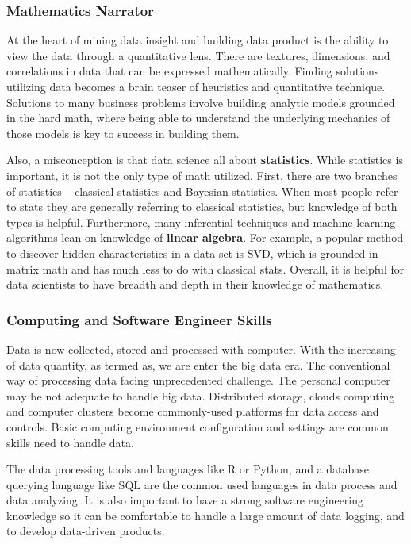 \documentclass[
]{book}
\begin{document}
\hypertarget{mathematics-narrator}{%
\subsubsection{Mathematics Narrator}\label{mathematics-narrator}}

At the heart of mining data insight and building data product is the ability to view the data through a quantitative lens. There are textures, dimensions, and correlations in data that can be expressed mathematically. Finding solutions utilizing data becomes a brain teaser of heuristics and quantitative technique. Solutions to many business problems involve building analytic models grounded in the hard math, where being able to understand the underlying mechanics of those models is key to success in building them.

Also, a misconception is that data science all about \textbf{statistics}. While statistics is important, it is not the only type of math utilized. First, there are two branches of statistics -- classical statistics and Bayesian statistics. When most people refer to stats they are generally referring to classical statistics, but knowledge of both types is helpful. Furthermore, many inferential techniques and machine learning algorithms lean on knowledge of \textbf{linear algebra}. For example, a popular method to discover hidden characteristics in a data set is SVD, which is grounded in matrix math and has much less to do with classical stats. Overall, it is helpful for data scientists to have breadth and depth in their knowledge of mathematics.

\hypertarget{computing-and-software-engineer-skills}{%
\subsubsection{Computing and Software Engineer Skills}\label{computing-and-software-engineer-skills}}

Data is now collected, stored and processed with computer. With the increasing of data quantity, as termed as, we are enter the big data era. The conventional way of processing data facing unprecedented challenge. The personal computer may be not adequate to handle big data. Distributed storage, clouds computing and computer clusters become commonly-used platforms for data access and controls. Basic computing environment configuration and settings are common skills need to handle data.

The data processing tools and languages like R or Python, and a database querying language like SQL are the common used languages in data process and data analyzing. It is also important to have a strong software engineering knowledge so it can be comfortable to handle a large amount of data logging, and to develop data-driven products.
\end{document}
